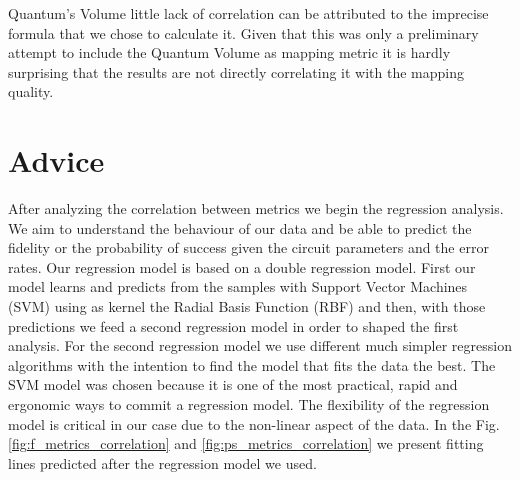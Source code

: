 Quantum's Volume little lack of correlation can be attributed to the imprecise formula that we chose to calculate it.
Given that this was only a preliminary attempt to include the Quantum Volume as mapping metric it is hardly surprising that the results are not directly correlating it with the mapping quality.

\section{Advice}
\label{sec:org2935a93}
After analyzing the correlation between metrics we begin the regression analysis.
We aim to understand the behaviour of our data and be able to predict the fidelity or the probability of success given the circuit parameters and the error rates.
Our regression model is based on a double regression model.
First our model learns and predicts from the samples with Support Vector Machines (SVM) using as kernel the Radial Basis Function (RBF) and then, with those predictions we feed a second regression model in order to shaped the first analysis.
For the second regression model we use different much simpler regression algorithms with the intention to find the model that fits the data the best.
The SVM model was chosen because it is one of the most practical, rapid and ergonomic ways to commit a regression model.
The flexibility of the regression model is critical in our case due to the non-linear aspect of the data.
In the Fig. \ref{fig:f_metrics_correlation} and \ref{fig:ps_metrics_correlation} we present fitting lines predicted after the regression model we used.
